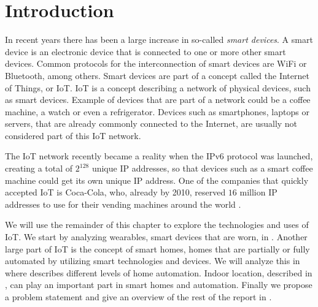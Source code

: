 \chapter{Introduction}\label{chap:introduction}
In recent years there has been a large increase in so-called \emph{smart devices}. 
A smart device is an electronic device that is connected to one or more other smart devices. 
Common protocols for the interconnection of smart devices are WiFi or Bluetooth, among others.
Smart devices are part of a concept called the Internet of Things, or IoT. 
IoT is a concept describing a network of physical devices, such as smart devices. 
Example of devices that are part of a network could be a coffee machine, a watch or even a refrigerator. 
Devices such as smartphones, laptops or servers, that are already commonly connected to the Internet, are usually not considered part of this IoT network. 

The IoT network recently became a reality when the IPv6 protocol was launched,
creating a total of $2^{128}$ unique IP addresses, 
so that devices such as a smart coffee machine could get its own unique IP address. 
One of the companies that quickly accepted IoT is Coca-Cola, 
who, already by 2010, reserved $16$ million IP addresses to use for \eg their vending machines around the world \cite{coke-iot}. 

We will use the remainder of this chapter to explore the technologies and uses of IoT. 
We start by analyzing wearables, \ie smart devices that are worn, in .
Another large part of IoT is the concept of smart homes, \ie homes that are partially or fully automated by utilizing smart technologies and devices. 
We will analyze this in  where  describes different levels of home automation. 
Indoor location, described in , can play an important part in smart homes and automation.
Finally we propose a problem statement  and give an overview of the rest of the report in .







